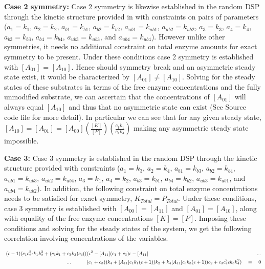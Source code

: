 \documentclass[9pt,lineno]{elife}
\begin{document}
\begin{appendixbox}
\textbf{Case 2 symmetry:} Case 2 symmetry is likewise established in the random DSP through the kinetic structure provided in  with constraints on pairs of parameters ($a_1 = k_1$, $a_2 = k_2$, $a_{b1} = k_{b1}$, $a_{b2} = k_{b2}$, $a_{ub1} = k_{ub1}$, $a_{ub2} = k_{ub2}$, $a_3 = k_3$, $a_4 = k_4$, $a_{b3} = k_{b3}$, $a_{b4} = k_{b4}$, $a_{ub3} = k_{ub3}$, and $a_{ub4} = k_{ub4}$). However unlike other symmetries, it needs no additional constraint on total enzyme amounts for exact symmetry to be present. Under these conditions case 2 symmetry is established with $[A_{01}]$ = $[A_{10}]$. Hence should symmetry break and an asymmetric steady state exist, it would be characterized by $[A_{01}] \neq [A_{10}]$. Solving for the steady states of these substrates in terms of the free enzyme concentrations and the fully unmodified substrate, we can ascertain that the concentrations of $[A_{01}]$ will always equal $[A_{10}]$ and thus that no asymmetric state can exist (See Source code file for more detail). In particular we can see that for any given steady state, $ [A_{10}] = [A_{01}] = [A_{00}]\left(\frac{[K]}{[P]}\right)\left(\frac{c_1k_1}{c_4k_4}\right)$ making any asymmetric steady state impossible. 

\textbf{Case 3:} Case 3 symmetry is established in the random DSP through the kinetic structure provided   with constraints ($a_1 = k_3$, $a_2 = k_4$, $a_{b1} = k_{b3}$, $a_{b2} = k_{b4}$, $a_{ub1} = k_{ub3}$, $a_{ub2} = k_{ub4}$, $a_3 = k_1$, $a_4 = k_2$, $a_{b3} = k_{b1}$, $a_{b4} = k_{b2}$, $a_{ub3} = k_{ub1}$, and $a_{ub4} = k_{ub2}$). In addition, the following constraint on total enzyme concentrations needs to be satisfied for exact symmetry, $K_{Total} = P_{Total}$. Under these conditions, case 3 symmetry is established with $[A_{00}]=[A_{11}]$ and $[A_{01}] = [A_{10}]$, along with equality of the free enzyme concentrations $[K] = [P]$. Imposing these conditions and solving for the steady states of the system, we get the following correlation involving concentrations of the variables.

\begin{equation}
\small{ \begin{aligned} 
        (\epsilon-1)(c_1c_2^2\epsilon k_1k_2^2+(c_1k_1+c_3k_3)c_4(((\epsilon^2-[A_{11}](c_1+c_3)\epsilon-[A_{11}] \hspace{70mm} ... \\ 
        \hspace{40mm} ... \hspace{10mm} (c_1+c_3))k_4+[A_{11}]c_1k_1(\epsilon+1))k_2+k_4[A_{11}]c_3k_3(\epsilon+1))c_2+c_3c_4^2\epsilon k_3k_4^2) \quad = \quad 0
    \end{aligned}}
\end{equation}


\end{appendixbox}
\end{document}
